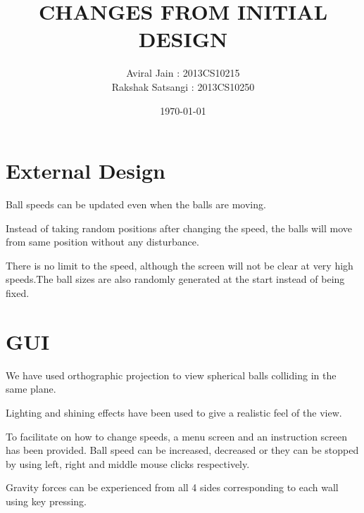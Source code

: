 \documentclass[10pt]{article}
\begin{document}
\title{CHANGES FROM INITIAL DESIGN}
\author{Aviral Jain : 2013CS10215\\Rakshak Satsangi : 2013CS10250\\
}
\date{\today}
\maketitle
\section{External Design}
	Ball speeds can be updated even when the balls are moving. 
	
	Instead of taking random positions after changing the speed, the balls will move from same position without any disturbance. 
	
	There is no limit to the speed, although the screen will not be clear at very high speeds.The ball sizes are also randomly generated at the start instead of being fixed. 


\section{GUI}
		We have used orthographic projection to view spherical balls colliding in the same plane. 
		
		Lighting and shining effects have been used to give a realistic feel of the view. 
		
		To facilitate on how to change speeds, a menu screen and an instruction screen has been provided. Ball speed can be increased, decreased or they can be stopped by using left, right and middle mouse clicks respectively. 
		
Gravity forces can be experienced from all 4 sides corresponding to each wall using key pressing.		
		
\end{document}
